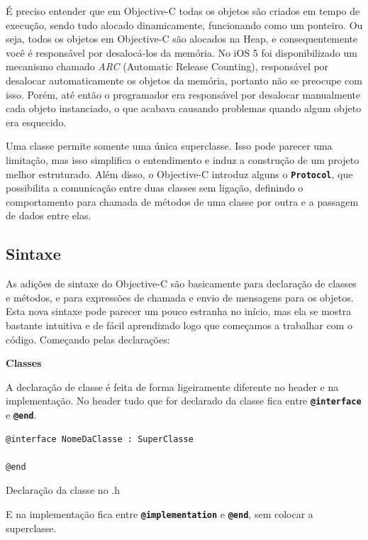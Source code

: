 \documentclass[a4paper,12pt,brazil,oneside]{book}
\begin{document}
É preciso entender que em Objective-C todas os objetos são criados em tempo de execução, sendo tudo alocado dinamicamente, funcionando como um ponteiro. Ou seja, todos os objetos em Objective-C são alocados na Heap, e consequentemente você é responsável por desalocá-los da memória. No iOS 5 foi disponibilizado um mecanismo chamado \emph{ARC} (Automatic Release Counting), responsável por desalocar automaticamente os objetos da memória, portanto não se preocupe com isso. Porém, até então o programador era responsável por desalocar manualmente cada objeto instanciado, o que acabava causando problemas quando algum objeto era esquecido.

Uma classe permite  somente uma única superclasse. Isso pode parecer uma limitação, mas isso simplifica o entendimento e induz a construção de um projeto melhor estruturado. Além disso, o Objective-C introduz alguns o \texttt{\textbf{Protocol}}, que possibilita a comunicação entre duas classes sem ligação, definindo o comportamento para chamada de métodos de uma classe por outra e a passagem de dados entre elas.


\subsection{Sintaxe}


As adições de sintaxe do Objective-C são basicamente para declaração de classes e métodos, e para expressões de chamada e envio de mensagens para os objetos. Esta nova sintaxe pode parecer um pouco estranha no início, mas ela se mostra bastante intuitiva e de fácil aprendizado logo que começamos a trabalhar com o código.
Começando pelas declarações:





\textbf{Classes}


A declaração de classe é feita de forma ligeiramente diferente no header e na implementação. No header tudo que for declarado da classe fica entre \texttt{\textbf{@interface}} e \texttt{\textbf{@end}}.

\begin{listing}
\begin{verbatim}
@interface NomeDaClasse : SuperClasse

@end
\end{verbatim}
\caption{Declaração da classe no .h}
\end{listing}


E na implementação fica entre \texttt{\textbf{@implementation}} e \texttt{\textbf{@end}}, sem colocar a superclasse.
\end{document}
